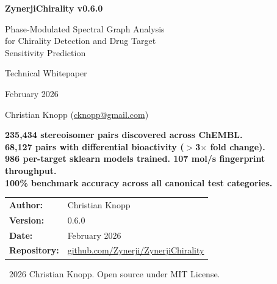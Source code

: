 \documentclass[11pt,a4paper]{article}
\begin{document}
\begin{titlepage}
\centering
\vspace*{1.5cm}

{\Huge\bfseries\color{zynerji} ZynerjiChirality v0.6.0\par}
\vspace{0.5cm}
{\Large\color{darktext} Phase-Modulated Spectral Graph Analysis\\for Chirality Detection and Drug Target\\Sensitivity Prediction\par}

\vspace{1.5cm}

{\large\color{gray} Technical Whitepaper\par}
\vspace{0.3cm}
{\normalsize February 2026\par}
\vspace{0.3cm}
{\normalsize Christian Knopp (\href{mailto:cknopp@gmail.com}{cknopp@gmail.com})\par}

\vspace{2cm}

\begin{keyresult}
\centering
\textbf{235,434 stereoisomer pairs discovered across ChEMBL.}\\[4pt]
\textbf{68,127 pairs with differential bioactivity ($>$3$\times$ fold change).}\\[4pt]
\textbf{986 per-target sklearn models trained. 107 mol/s fingerprint throughput.}\\[4pt]
\textbf{100\% benchmark accuracy across all canonical test categories.}
\end{keyresult}

\vspace{1.5cm}

\begin{tabular}{ll}
\textbf{Author:}         & Christian Knopp \\
\textbf{Version:}        & 0.6.0 \\
\textbf{Date:}           & February 2026 \\
\textbf{Repository:}     & \href{https://github.com/Zynerji/ZynerjiChirality}{github.com/Zynerji/ZynerjiChirality} \\
\end{tabular}

\vfill
{\small\color{gray}\textcopyright\ 2026 Christian Knopp. Open source under MIT License.}
\end{titlepage}
\end{document}
